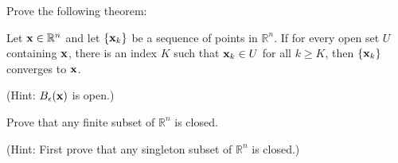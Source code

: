 \documentclass[letterpaper, twoside, 12pt]{book}
\begin{document}
\begin{exercise}[4]
Prove the following theorem:

Let \(\mathbf x\in\mathbb R^n\) and let \(\{\mathbf x_k\}\) be a sequence
of points in \(\mathbb R^n\). If for every open set \(U\)
containing \(\mathbf x\), there is an index \(K\) such that
\(\mathbf x_k\in U\) for all \(k\geq K\),
then \(\{\mathbf x_k\}\) converges to \(\mathbf x\).

(Hint: \(B_\epsilon(\mathbf x)\) is open.)
\end{exercise}
\begin{solution}

\end{solution}

\begin{exercise}[5]
Prove that any finite subset of \(\mathbb R^n\) is closed.

(Hint: First
prove that any singleton subset of \(\mathbb R^n\) is closed.)
\end{exercise}
\begin{solution}

\end{solution}
\end{document}

